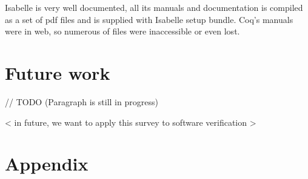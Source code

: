 \documentclass[article]{aaltoseries}
\begin{document}
Isabelle is very well documented, all its manuals and documentation is compiled as a set of pdf files and is supplied with Isabelle setup bundle. Coq's manuals were in web, so numerous of files were inaccessible or even lost.





\section{Future work}
\label{sec:future_work}

// TODO (Paragraph is still in progress)

< in future, we want to apply this survey to software verification >






\newpage
\appendix

\section{Appendix}
\label{appx_diff_table}
\end{document}

